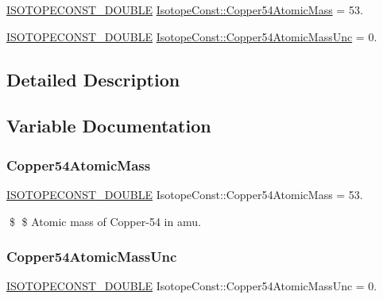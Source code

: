 \begin{DoxyCompactItemize}
\item 
\mbox{\hyperlink{group___isotope_const-_macros_ga8f45a7272ce02c0b4c65c44636ed719a}{I\+S\+O\+T\+O\+P\+E\+C\+O\+N\+S\+T\+\_\+\+D\+O\+U\+B\+LE}} \mbox{\hyperlink{group___isotope_const-_copper-_cu54_ga112920c3ac32c250b4f6755cf1c962b0}{Isotope\+Const\+::\+Copper54\+Atomic\+Mass}} = 53.
\item 
\mbox{\hyperlink{group___isotope_const-_macros_ga8f45a7272ce02c0b4c65c44636ed719a}{I\+S\+O\+T\+O\+P\+E\+C\+O\+N\+S\+T\+\_\+\+D\+O\+U\+B\+LE}} \mbox{\hyperlink{group___isotope_const-_copper-_cu54_gaf59b6fcfcc561bb755799d176274d470}{Isotope\+Const\+::\+Copper54\+Atomic\+Mass\+Unc}} = 0.
\end{DoxyCompactItemize}


\subsection{Detailed Description}


\subsection{Variable Documentation}
\mbox{\label{group___isotope_const-_copper-_cu54_ga112920c3ac32c250b4f6755cf1c962b0}} 
\subsubsection{\texorpdfstring{Copper54\+Atomic\+Mass}{Copper54AtomicMass}}
{\footnotesize\ttfamily \mbox{\hyperlink{group___isotope_const-_macros_ga8f45a7272ce02c0b4c65c44636ed719a}{I\+S\+O\+T\+O\+P\+E\+C\+O\+N\+S\+T\+\_\+\+D\+O\+U\+B\+LE}} Isotope\+Const\+::\+Copper54\+Atomic\+Mass = 53.}

\$ \$ Atomic mass of Copper-\/54 in amu. \mbox{\label{group___isotope_const-_copper-_cu54_gaf59b6fcfcc561bb755799d176274d470}} 
\subsubsection{\texorpdfstring{Copper54\+Atomic\+Mass\+Unc}{Copper54AtomicMassUnc}}
{\footnotesize\ttfamily \mbox{\hyperlink{group___isotope_const-_macros_ga8f45a7272ce02c0b4c65c44636ed719a}{I\+S\+O\+T\+O\+P\+E\+C\+O\+N\+S\+T\+\_\+\+D\+O\+U\+B\+LE}} Isotope\+Const\+::\+Copper54\+Atomic\+Mass\+Unc = 0.}


